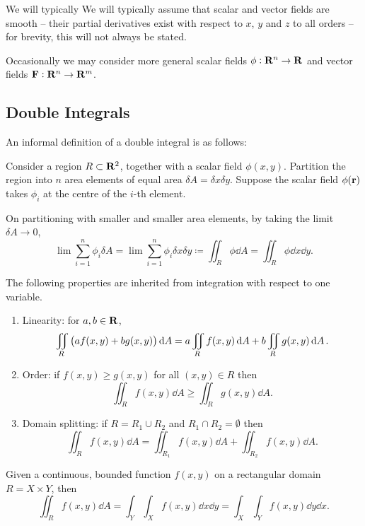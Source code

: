 \begin{remark}
We will typically We will typically assume that scalar and vector fields are smooth -- their partial derivatives exist with respect to $x$, $y$ and $z$ to all orders -- for brevity, this will not always be stated.

Occasionally we may consider more general scalar fields $\phi:\mathbf R^n\to\mathbf R$ and vector fields $\vb{F}:\mathbf R^n\to\mathbf R^m$.
\end{remark}

\subsection{Double Integrals}
An informal definition of a double integral is as follows:

Consider a region $R\subset\mathbf R^2$, together with a scalar field $\phi(x,y)$. Partition the region into $n$ area elements of equal area $\delta A=\delta x\delta y$. Suppose the scalar field $\phi(\vb{r})$ takes $\phi_i$ at the centre of the $i$-th element.

On partitioning with smaller and smaller area elements, by taking the limit $\delta A\to0$,
\[\lim\sum_{i=1}^{n}\phi_i\delta A=\lim\sum_{i=1}^{n}\phi_i\delta x\delta y\coloneqq\iint_R\phi\dd{A}=\iint_R\phi\dd{x}\dd{y}.\]

\begin{proposition}
The following properties are inherited from integration with respect to one variable.
\begin{enumerate}[label=(\roman*)]
\item Linearity: for $a,b\in\mathbf R$,
\[\iint_R\left(af(x,y)+bg(x,y)\right)\dd{A}=a\iint_Rf(x,y)\dd{A}+b\iint_Rg(x,y)\dd{A}.\]
\item Order: if $f(x,y)\ge g(x,y)$ for all $(x,y)\in R$ then
\[\iint_Rf(x,y)\dd{A}\ge\iint_Rg(x,y)\dd{A}.\]
\item Domain splitting: if $R=R_1\cup R_2$ and $R_1\cap R_2=\emptyset$ then
\[\iint_Rf(x,y)\dd{A}=\iint_{R_1}f(x,y)\dd{A}+\iint_{R_2}f(x,y)\dd{A}.\]
\end{enumerate}
\end{proposition}

\begin{proposition}
Given a continuous, bounded function $f(x,y)$ on a rectangular domain $R=X\times Y$, then
\begin{equation}
\iint_{R}f(x,y)\dd{A}=\int_{Y}\int_{X}f(x,y)\dd{x}\dd{y}=\int_{X}\int_{Y}f(x,y)\dd{y}\dd{x}.
\end{equation}
\end{proposition}

